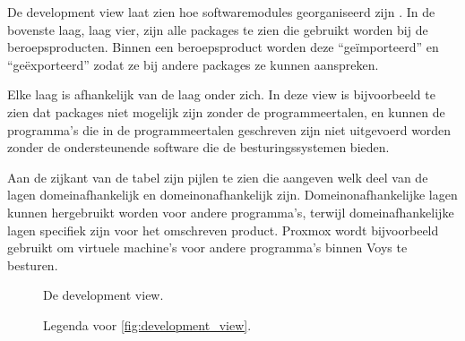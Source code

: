\documentclass[../views.tex]{subfiles}
\begin{document}
De development view laat zien hoe softwaremodules georganiseerd zijn \parencite{architectural_blueprints}. In de bovenste laag, laag vier, zijn alle packages te zien die gebruikt worden bij de beroepsproducten. Binnen een beroepsproduct worden deze ``geïmporteerd'' en ``geëxporteerd'' zodat ze bij andere packages ze kunnen aanspreken.

Elke laag is afhankelijk van de laag onder zich. In deze view is bijvoorbeeld te zien dat packages niet mogelijk zijn zonder de programmeertalen, en kunnen de programma's die in de programmeertalen geschreven zijn niet uitgevoerd worden zonder de ondersteunende software die de besturingssystemen bieden.

Aan de zijkant van de tabel zijn pijlen te zien die aangeven welk deel van de lagen domeinafhankelijk en domeinonafhankelijk zijn. Domeinonafhankelijke lagen kunnen hergebruikt worden voor andere programma's, terwijl domeinafhankelijke lagen specifiek zijn voor het omschreven product. Proxmox wordt bijvoorbeeld gebruikt om virtuele machine's voor andere programma's binnen Voys te besturen.

\begin{figure}[ht]
  \centering
  \caption{De development view.}
  \label{fig:development_view}
\end{figure}

\begin{figure}[ht]
  \centering
  \caption{Legenda voor \autoref{fig:development_view}.}
  \label{fig:development_view_legend}
\end{figure}
\end{document}
